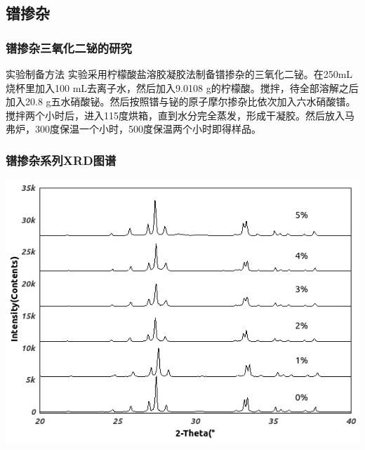 \documentclass[xetex,compress]{mybeamer}
\begin{document}
\subsection{镨掺杂}
\begin{frame}
\frametitle{镨掺杂三氧化二铋的研究}
\begin{block}{实验制备方法}
实验采用柠檬酸盐溶胶凝胶法制备镨掺杂的三氧化二铋。在250mL烧杯里加入100 mL去离子水，然后加入9.0108 g的柠檬酸。搅拌，待全部溶解之后加入20.8 g五水硝酸铋。然后按照镨与铋的原子摩尔掺杂比依次加入六水硝酸镨。搅拌两个小时后，进入115度烘箱，直到水分完全蒸发，形成干凝胶。然后放入马弗炉，300度保温一个小时，500度保温两个小时即得样品。
\end{block}
\end{frame}

\begin{frame}
\frametitle{镨掺杂系列XRD图谱}
\begin{block}{}
\centering
\includegraphics[scale=7]{figures/镨掺杂XRD.jpg} 
\end{block}
\end{frame}
\end{document}
